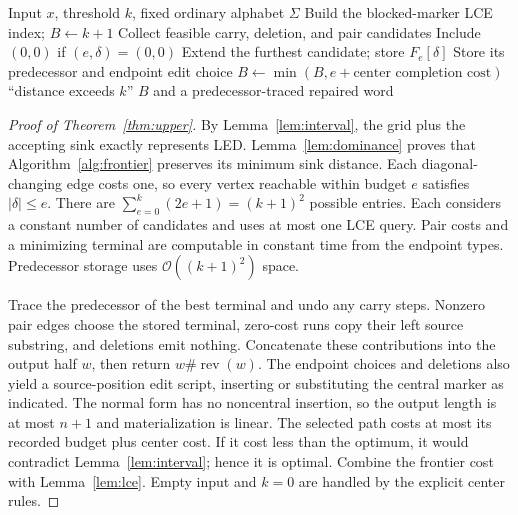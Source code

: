 \documentclass[sigconf,screen]{acmart}
\newcommand{\rev}{\operatorname{rev}}
\newcommand{\Oh}{\mathcal O}
\newcommand{\krepair}{\textsc{K-Repair}}
\theoremstyle{definition}
\begin{document}
\begin{algorithm}[t]
\caption{\krepair{} for marked mirrors}
\label{alg:frontier}
\begin{algorithmic}[1]
\Require Input $x$, threshold $k$, fixed ordinary alphabet $\Sigma$
\State Build the blocked-marker LCE index; $B\gets k+1$
    \State Collect feasible carry, deletion, and pair candidates
    \State Include $(0,0)$ if $(e,\delta)=(0,0)$
      \State Extend the furthest candidate; store $F_e[\delta]$
      \State Store its predecessor and endpoint edit choice
        \State $B\gets\min(B,e+\text{center completion cost})$
      \EndIf
    \EndIf
  \EndFor
\EndFor
{} \State \Return ``distance exceeds $k$''
\Else \State \Return $B$ and a predecessor-traced repaired word
\EndIf
\end{algorithmic}
\end{algorithm}

\begin{proof}[Proof of Theorem~\ref{thm:upper}]
By Lemma~\ref{lem:interval}, the grid plus the accepting sink exactly represents LED. Lemma~\ref{lem:dominance} proves that Algorithm~\ref{alg:frontier} preserves its minimum sink distance. Each diagonal-changing edge costs one, so every vertex reachable within budget $e$ satisfies $|\delta|\le e$. There are $\sum_{e=0}^k(2e+1)=(k+1)^2$ possible entries. Each considers a constant number of candidates and uses at most one LCE query. Pair costs and a minimizing terminal are computable in constant time from the endpoint types. Predecessor storage uses $\Oh((k+1)^2)$ space.

Trace the predecessor of the best terminal and undo any carry steps. Nonzero pair edges choose the stored terminal, zero-cost runs copy their left source substring, and deletions emit nothing. Concatenate these contributions into the output half $w$, then return $w\#\rev(w)$. The endpoint choices and deletions also yield a source-position edit script, inserting or substituting the central marker as indicated. The normal form has no noncentral insertion, so the output length is at most $n+1$ and materialization is linear. The selected path costs at most its recorded budget plus center cost. If it cost less than the optimum, it would contradict Lemma~\ref{lem:interval}; hence it is optimal. Combine the frontier cost with Lemma~\ref{lem:lce}. Empty input and $k=0$ are handled by the explicit center rules.
\end{proof}
\end{document}
